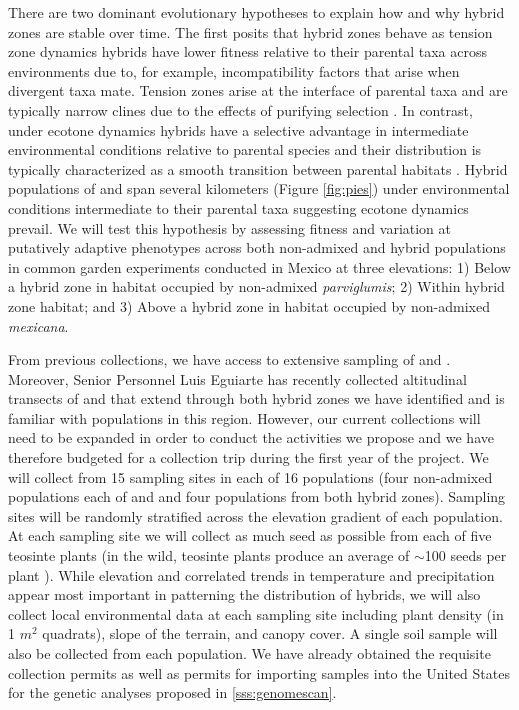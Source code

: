 There are two dominant evolutionary hypotheses to explain how and why hybrid zones are stable over time.
The first posits that hybrid zones behave as tension zone dynamics hybrids have lower fitness relative to their parental taxa across environments due to, for example, incompatibility factors that arise when divergent taxa mate.
Tension zones arise at the interface of parental taxa and are typically narrow clines due to the effects of purifying selection \citep{abbott2014}.
In contrast, under ecotone dynamics hybrids have a selective advantage in intermediate environmental conditions relative to parental species and their distribution is typically characterized as a smooth transition between parental habitats \citep{abbott2014}.
Hybrid populations of \zp{} and \zm{} span several kilometers (Figure \ref{fig:pies}) under environmental conditions intermediate to their parental taxa suggesting ecotone dynamics prevail.
We will test this hypothesis by assessing fitness and variation at putatively adaptive phenotypes across both non-admixed and hybrid populations in common garden experiments conducted in Mexico at three elevations: 1) Below a hybrid zone in habitat occupied by non-admixed \emph{parviglumis}; 2) Within hybrid zone habitat; and 3) Above a hybrid zone in habitat occupied by non-admixed \emph{mexicana}. 

From previous collections, we have access to extensive sampling of \zm{} and \zp{}.
Moreover, Senior Personnel Luis Eguiarte has recently collected altitudinal transects of \zp{} and \zm{} that extend through both hybrid zones we have identified \citep{Diez2013} and is familiar with populations in this region.
However, our current collections will need to be expanded in order to conduct the activities we propose and we have therefore budgeted for a collection trip during the first year of the project.
We will collect from 15 sampling sites in each of 16 populations (four non-admixed populations each of \zp{} and \zm{} and four populations from both hybrid zones).
Sampling sites will be randomly stratified across the elevation gradient of each population.
At each sampling site we will collect as much seed as possible from each of five teosinte plants (in the wild, teosinte plants produce an average of $\sim$100 seeds per plant \citep{wilkes1967teosinte}). 
While elevation and correlated trends in temperature and precipitation appear most important in patterning the distribution of hybrids, we will also collect local environmental data at each sampling site including plant density (in 1 $m^2$ quadrats), slope of the terrain, and canopy cover.
A single soil sample will also be collected from each population.  
We have already obtained the requisite collection permits as well as permits for importing samples into the United States for the genetic analyses proposed in \ref{sss:genomescan}.

